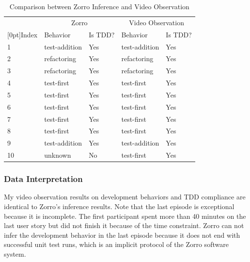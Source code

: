 \begin{table}[!htbp]
\centering
  \begin{tabular}{|l|p{2cm}|l|p{2cm}|l|}
  \hline
         & \multicolumn{2}{c|}{Zorro} & 
           \multicolumn{2}{c|}{Video Observation} \\ \cline{2-5}
   \raisebox{1.5ex}[0pt]{Index} 
         & Behavior       & Is TDD? & Behavior      & Is TDD? \\ \hline
    1    & test-addition  & Yes	    & test-addition & Yes   \\ \hline
    2    & refactoring	  & Yes	    & refactoring   & Yes   \\ \hline
    3    & refactoring	  & Yes	    & refactoring   & Yes   \\ \hline
    4    & test-first     & Yes     & test-first    & Yes   \\ \hline
    5    & test-first     & Yes     & test-first    & Yes   \\ \hline
    6    & test-first     & Yes	    & test-first    & Yes  \\ \hline
    7    & test-first     & Yes	    & test-first    & Yes  \\ \hline
    8    & test-first     & Yes     & test-first    & Yes   \\ \hline
    9    & test-addition  & Yes	    & test-addition	& Yes	 \\ \hline
   10    & unknown        & No      & test-first    & Yes  \\ \hline 
  \end{tabular}
  \caption{Comparison between Zorro Inference and Video Observation}\label{tab:BehaviorObservation}  
\end{table}

\subsubsection{Data Interpretation}

My video observation results on development behaviors and TDD compliance
are identical to Zorro's inference results. Note that the last
episode is exceptional because it is incomplete. The first participant
spent more than 40 minutes on the last user story but did not finish it
because of the time constraint. Zorro can not infer the development
behavior in the last episode because it does not end with successful 
unit test runs, which is an implicit protocol of the Zorro software 
system. 

